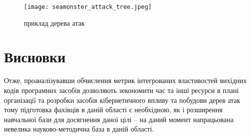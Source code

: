 \begin{figure}
    \centering
    \texttt{[image: seamonster\_attack\_tree.jpeg]}
    \caption{приклад дерева атак}
    \label{fig:attack_tree_example}
\end{figure}

\pagebreak

\section*{Висновки}
Отже, проаналізувавши обчислення метрик інтегрованих властивостей вихідних кодів програмних засобів дозволяють зекономити час та інші ресурси в плані організації та розробки засобів кібернетичного впливу та побудови дерев атак тому підготовка фахівців в даній області є необхідною, як і розширення навчальної бази для досягнення даної цілі – на даний момент напрацьована невелика науково-методична база в даній області.